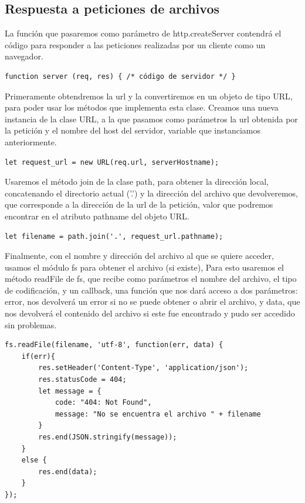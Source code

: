 \documentclass[11pt]{article}
\begin{document}
\subsection{Respuesta a peticiones de archivos}
\label{sec:org401bc76}
La función que pasaremos como parámetro de http.createServer contendrá el código
para responder a las peticiones realizadas por un cliente como un navegador.

\begin{verbatim}
function server (req, res) { /* código de servidor */ }
\end{verbatim}

Primeramente obtendremos la url y la convertiremos en un objeto de tipo URL,
para poder usar los métodos que implementa esta clase.
Creamos una nueva instancia de la clase URL, a la que pasamos como parámetros la url obtenida por la petición
y el nombre del host del servidor, variable que instanciamos anteriormente.

\begin{verbatim}
let request_url = new URL(req.url, serverHostname);
\end{verbatim}

Usaremos el método join de la clase path, para obtener la dirección local,
concatenando el directorio actual ('.') y la dirección del archivo que devolveremos,
que corresponde a la dirección de la url de la petición,
valor que podremos encontrar en el atributo pathname del objeto URL.

\begin{verbatim}
let filename = path.join('.', request_url.pathname);
\end{verbatim}

Finalmente, con el nombre y dirección del archivo al que se quiere acceder,
usamos el módulo fs para obtener el archivo (si existe),
Para esto usaremos el método readFile de fs, que recibe como parámetros el nombre del archivo,
el tipo de codificación, y un callback, una función que nos dará acceso a dos parámetros:
error, nos devolverá un error si no se puede obtener o abrir el archivo,
y data, que nos devolverá el contenido del archivo si este fue encontrado y pudo ser accedido sin problemas.

\begin{verbatim}
fs.readFile(filename, 'utf-8', function(err, data) {
    if(err){
        res.setHeader('Content-Type', 'application/json');
        res.statusCode = 404;
        let message = {
            code: "404: Not Found",
            message: "No se encuentra el archivo " + filename
        }
        res.end(JSON.stringify(message));
    }
    else {
        res.end(data);
    }
});
\end{verbatim}
\end{document}
